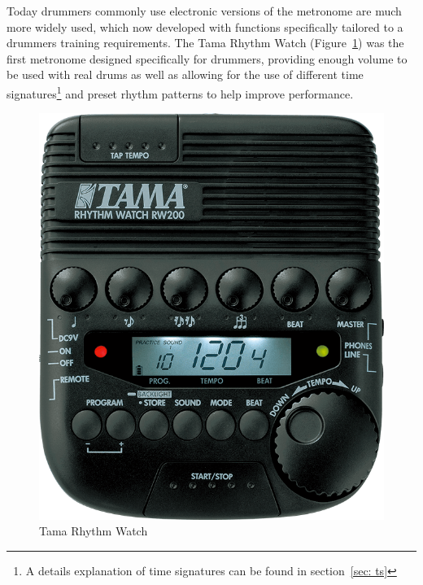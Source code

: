 \documentclass[a4paper, 11pt]{article}
\begin{document}
Today drummers commonly use electronic versions of the metronome are much more widely used, which now developed with functions specifically tailored to a drummers training requirements. The Tama Rhythm Watch (Figure~\ref{fig: RW200}) was the first metronome designed specifically for drummers, providing enough volume to be used with real drums as well as allowing for the use of different time signatures\footnote{A details explanation of time signatures can be found in section~\ref{sec: ts}} and preset rhythm patterns to help improve performance.\par

\begin{figure}[htbp]
	\centering
	\includegraphics[scale=0.2]{RW200}
	\caption{Tama Rhythm Watch}%
	\label{fig: RW200}
\end{figure}
\end{document}
